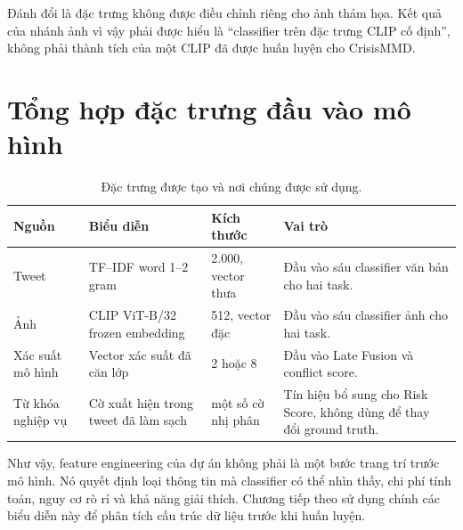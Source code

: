Đánh đổi là đặc trưng không được điều chỉnh riêng cho ảnh thảm họa. Kết quả của
nhánh ảnh vì vậy phải được hiểu là ``classifier trên đặc trưng CLIP cố định'',
không phải thành tích của một CLIP đã được huấn luyện cho CrisisMMD.

\section{Tổng hợp đặc trưng đầu vào mô hình}

\begin{table}[H]\centering
\caption{Đặc trưng được tạo và nơi chúng được sử dụng.}
\begin{tabularx}{\textwidth}{p{2.4cm}p{3.3cm}p{2.4cm}X}
\toprule
\textbf{Nguồn} & \textbf{Biểu diễn} & \textbf{Kích thước} & \textbf{Vai trò}\\
\midrule
Tweet & TF--IDF word 1--2 gram & 2.000, vector thưa &
Đầu vào sáu classifier văn bản cho hai task.\\
Ảnh & CLIP ViT-B/32 frozen embedding & 512, vector đặc &
Đầu vào sáu classifier ảnh cho hai task.\\
Xác suất mô hình & Vector xác suất đã căn lớp & 2 hoặc 8 &
Đầu vào Late Fusion và conflict score.\\
Từ khóa nghiệp vụ & Cờ xuất hiện trong tweet đã làm sạch & một số cờ nhị phân &
Tín hiệu bổ sung cho Risk Score, không dùng để thay đổi ground truth.\\
\bottomrule
\end{tabularx}
\end{table}

Như vậy, feature engineering của dự án không phải là một bước trang trí trước
mô hình. Nó quyết định loại thông tin mà classifier có thể nhìn thấy, chi phí
tính toán, nguy cơ rò rỉ và khả năng giải thích. Chương tiếp theo sử dụng chính
các biểu diễn này để phân tích cấu trúc dữ liệu trước khi huấn luyện.

